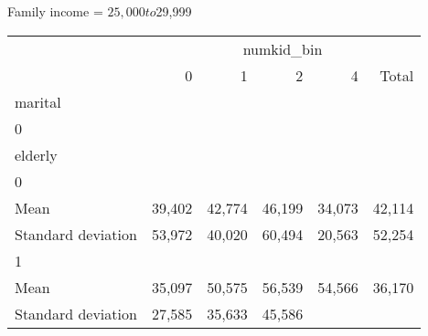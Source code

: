 Family income = $25,000 to $29,999
\begin{tabular}{llllll}
\cline{1-6}
\multicolumn{1}{c}{} &
  \multicolumn{5}{|c}{numkid\_bin} \\
\multicolumn{1}{c}{} &
  \multicolumn{1}{|r}{0} &
  \multicolumn{1}{r}{1} &
  \multicolumn{1}{r}{2} &
  \multicolumn{1}{r}{4} &
  \multicolumn{1}{r}{Total} \\
\cline{1-6}
\multicolumn{1}{l}{marital} &
  \multicolumn{1}{|r}{} &
  \multicolumn{1}{r}{} &
  \multicolumn{1}{r}{} &
  \multicolumn{1}{r}{} &
  \multicolumn{1}{r}{} \\
\multicolumn{1}{l}{\hspace{1em}0} &
  \multicolumn{1}{|r}{} &
  \multicolumn{1}{r}{} &
  \multicolumn{1}{r}{} &
  \multicolumn{1}{r}{} &
  \multicolumn{1}{r}{} \\
\multicolumn{1}{l}{\hspace{2em}elderly} &
  \multicolumn{1}{|r}{} &
  \multicolumn{1}{r}{} &
  \multicolumn{1}{r}{} &
  \multicolumn{1}{r}{} &
  \multicolumn{1}{r}{} \\
\multicolumn{1}{l}{\hspace{3em}0} &
  \multicolumn{1}{|r}{} &
  \multicolumn{1}{r}{} &
  \multicolumn{1}{r}{} &
  \multicolumn{1}{r}{} &
  \multicolumn{1}{r}{} \\
\multicolumn{1}{l}{\hspace{4em}Mean} &
  \multicolumn{1}{|r}{39,402} &
  \multicolumn{1}{r}{42,774} &
  \multicolumn{1}{r}{46,199} &
  \multicolumn{1}{r}{34,073} &
  \multicolumn{1}{r}{42,114} \\
\multicolumn{1}{l}{\hspace{4em}Standard deviation} &
  \multicolumn{1}{|r}{53,972} &
  \multicolumn{1}{r}{40,020} &
  \multicolumn{1}{r}{60,494} &
  \multicolumn{1}{r}{20,563} &
  \multicolumn{1}{r}{52,254} \\
\multicolumn{1}{l}{\hspace{3em}1} &
  \multicolumn{1}{|r}{} &
  \multicolumn{1}{r}{} &
  \multicolumn{1}{r}{} &
  \multicolumn{1}{r}{} &
  \multicolumn{1}{r}{} \\
\multicolumn{1}{l}{\hspace{4em}Mean} &
  \multicolumn{1}{|r}{35,097} &
  \multicolumn{1}{r}{50,575} &
  \multicolumn{1}{r}{56,539} &
  \multicolumn{1}{r}{54,566} &
  \multicolumn{1}{r}{36,170} \\
\multicolumn{1}{l}{\hspace{4em}Standard deviation} &
  \multicolumn{1}{|r}{27,585} &
  \multicolumn{1}{r}{35,633} &
  \multicolumn{1}{r}{45,586} &

\end{tabular}
